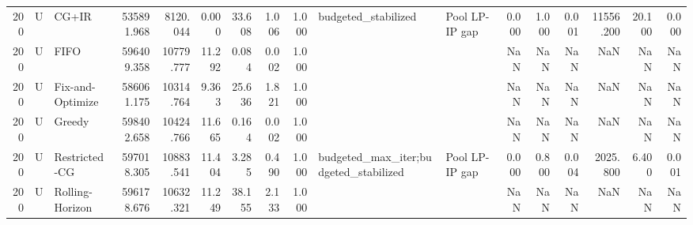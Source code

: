 \begin{tabular}{rllrrrrrrllrrrrrr}
200 & U & CG+IR & 535891.968 & 8120.044 & 0.000 & 33.608 & 1.006 & 1.000 & budgeted_stabilized & Pool LP-IP gap & 0.000 & 1.000 & 0.001 & 11556.200 & 20.100 & 0.000 \\
200 & U & FIFO & 596409.358 & 10779.777 & 11.292 & 0.084 & 0.002 & 1.000 &  &  & NaN & NaN & NaN & NaN & NaN & NaN \\
200 & U & Fix-and-Optimize & 586061.175 & 10314.764 & 9.363 & 25.636 & 1.821 & 1.000 &  &  & NaN & NaN & NaN & NaN & NaN & NaN \\
200 & U & Greedy & 598402.658 & 10424.766 & 11.665 & 0.164 & 0.002 & 1.000 &  &  & NaN & NaN & NaN & NaN & NaN & NaN \\
200 & U & Restricted-CG & 597018.305 & 10883.541 & 11.404 & 3.285 & 0.490 & 1.000 & budgeted_max_iter;budgeted_stabilized & Pool LP-IP gap & 0.000 & 0.800 & 0.004 & 2025.800 & 6.400 & 0.001 \\
200 & U & Rolling-Horizon & 596178.676 & 10632.321 & 11.249 & 38.155 & 2.133 & 1.000 &  &  & NaN & NaN & NaN & NaN & NaN & NaN \\
\bottomrule
\end{tabular}
